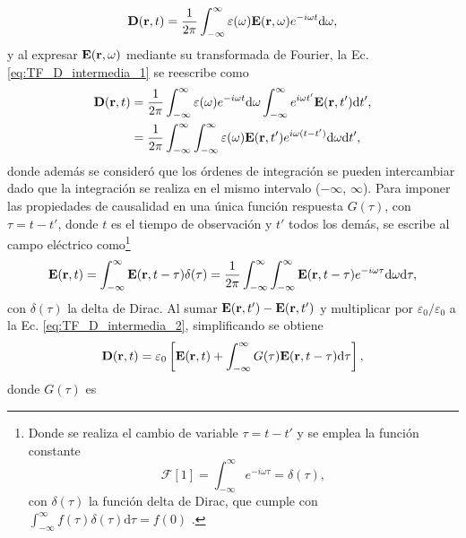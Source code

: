 %
\begin{equation}
	\vb{D}(\vb{r},t)=\frac{1}{2\pi}\int_{-\infty}^{\infty}\varepsilon(\omega)\vb{E}(\vb{r},\omega)e^{-i\omega t}\text{d}\omega,\label{eq:TF_D_intermedia_1}
\end{equation}
%
y al expresar $\vb{E}(\vb{r},\omega)$ mediante su transformada de Fourier, la Ec. \eqref{eq:TF_D_intermedia_1} se reescribe como
%
\begin{align}
	\vb{D}(\vb{r},t)&=\frac{1}{2\pi}\int_{-\infty}^{\infty}\varepsilon(\omega)e^{-i\omega t}\text{d}\omega\int_{-\infty}^{\infty}e^{i\omega t'}\vb{E}(\vb{r},t')\text{d}t',\\
	&=\frac{1}{2\pi}\int_{-\infty}^{\infty}\int_{-\infty}^{\infty}\varepsilon(\omega)\vb{E}(\vb{r},t') e^{i\omega (t-t')} \text{d}\omega \text{d}t',
	\label{eq:TF_D_intermedia_2}
\end{align}
%
donde además se consideró que los órdenes de integración se pueden intercambiar dado que la integración se realiza en el mismo intervalo ($-\infty$, $\infty$). Para imponer las propiedades de causalidad en una única función respuesta $G(\tau)$, con $\tau = t - t'$, donde $t$ es el tiempo de observación y $t'$ todos los demás, se escribe al campo eléctrico como\footnote{Donde se realiza el cambio de variable $\tau = t - t'$ y se emplea la función constante \cite{arfkenMathematicalMethodsPhysicists2011}
\begin{equation}
	\mathscr{F}[1]=\int_{-\infty}^{\infty}e^{-i\omega\tau}=\delta(\tau),
	\end{equation}
%
con $\delta(\tau)$ la función delta de Dirac, que cumple con $\int_{-\infty}^{\infty}f(\tau)\delta(\tau)\text{d}\tau=f(0)$ \cite{arfkenMathematicalMethodsPhysicists2011}.
}
\begin{equation}
	\vb{E}(\vb{r},t)=\int_{-\infty}^{\infty}\vb{E}(\vb{r},t-\tau)\delta(\tau)=\frac{1}{2\pi}\int_{-\infty}^{\infty}\int_{-\infty}^{\infty}\vb{E}(\vb{r},t-\tau)e^{-i\omega\tau}\text{d}\omega\text{d}\tau,
\end{equation}
%
con $\delta(\tau)$ la delta de Dirac. Al sumar $\vb{E}(\vb{r},t')-\vb{E}(\vb{r},t')$ y multiplicar por $\varepsilon_0/\varepsilon_0$ a la Ec. \eqref{eq:TF_D_intermedia_2}, simplificando se obtiene
%
\begin{equation}
	\vb{D}(\vb{r},t)=\varepsilon_0\left[\vb{E}(\vb{r},t)+\int_{-\infty}^{\infty}G(\tau)\vb{E}(\vb{r},t-\tau)\text{d}\tau\right],\label{eq:TF_D_final} 
\end{equation}
%
\noindent donde $G(\tau)$ es \cite{jacksonClassicalElectrodynamics2021}
